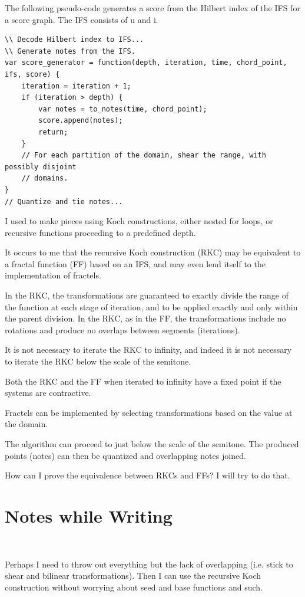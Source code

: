 \documentclass[english,11pt,letterpaper,onecolumn]{scrartcl}
\numberwithin{equation}{section}
\begin{document}
The following pseudo-code generates a score from the Hilbert index of the IFS
for a score graph. The IFS consists of u and i.

\begin{lstlisting}
\\ Decode Hilbert index to IFS...
\\ Generate notes from the IFS.
var score_generator = function(depth, iteration, time, chord_point, ifs, score) {
    iteration = iteration + 1;
    if (iteration > depth) {
        var notes = to_notes(time, chord_point);
        score.append(notes);
        return;
    }
    // For each partition of the domain, shear the range, with possibly disjoint
    // domains.
}
// Quantize and tie notes...
\end{lstlisting}

I used to make pieces using Koch constructions, either nested for loops, or recursive
functions proceeding to a predefined depth.

It occurs to me that the recursive Koch construction (RKC) may be equivalent to a
fractal function (FF) based on an IFS, and may even lend itself to the implementation
of fractels.

In the RKC, the transformations are guaranteed to exactly divide the range of the
function at each stage of iteration, and to be applied exactly and only within the
parent division. In the RKC, as in the FF, the transformations include no rotations and
produce no overlaps between segments (iterations).

It is not necessary to iterate the RKC to infinity, and indeed it is not necessary to
iterate the RKC below the scale of the semitone.

Both the RKC and the FF when iterated to infinity have a fixed point if the systems are
contractive.

Fractels can be implemented by selecting transformations based on the value at the domain.

The algorithm can proceed to just below the scale of the semitone. The produced points
(notes) can then be quantized and overlapping notes joined.

How can I prove the equivalence between RKCs and FFs? I will try to do that.

\section{Notes while Writing}\

Perhaps I need to throw out everything but the lack of overlapping (i.e. stick
to shear and bilinear transformations). Then I can use the recursive Koch
construction without worrying about seed and base functions and such.
\end{document}

